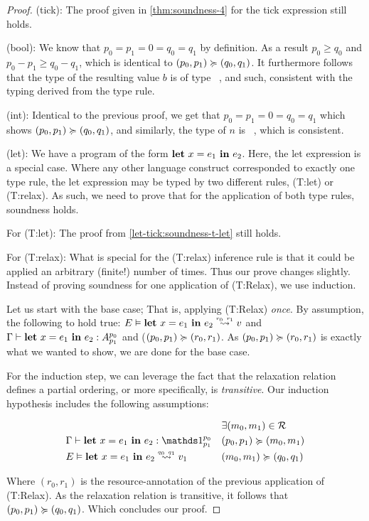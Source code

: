 \begin{proof}

(tick): The proof given in \cref{thm:soundness-4} for the tick expression still holds.

(bool): We know that \(p_0 = p_1 = 0 = q_0 = q_1\) by definition. As a result \(p_0 \geq q_0\) and \(p_0 - p_1 \geq q_0 - q_1\), which is identical to \((p_0, p_1) \succcurlyeq (q_0, q_1)\). It furthermore follows that the type of the resulting value \(b\) is of type \bool~, and such, consistent with the typing derived from the type rule.

(int): Identical to the previous proof, we get that \(p_0 = p_1 = 0 = q_0 = q_1\) which shows \((p_0, p_1) \succcurlyeq (q_0, q_1)\), and similarly, the type of \(n\) is \typeint~, which is consistent.

(let): We have a program of the form \(\mathbf{let}~x = e_1~\mathbf{in}~e_2\). Here, the let expression is a special case. Where any other language construct corresponded to exactly one type rule, the let expression may be typed by two different rules, (T:let) or (T:relax). As such, we need to prove that for the application of both type rules, soundness holds.  

For (T:let): The proof from \cref{let-tick:soundness-t-let} still holds.

For (T:relax): What is special for the (T:relax) inference rule is that it could be applied an arbitrary (finite!) number of times. Thus our prove changes slightly. Instead of proving soundness for one application of (T:Relax), we use induction. 

Let us start with the base case; That is, applying (T:Relax) \emph{once}. By assumption, the following to hold true: \(\evals{E}{\letexp{x}{e_1}{e_2}}{v}{r_0}{r_1}\) and \(\Gamma \vdash \mathbf{let}~x = e_1~\mathbf{in}~e_2 : A ^{p_0}_{p_1}\) and (\((p_0, p_1) \succcurlyeq (r_0, r_1)\). As \((p_0, p_1) \succcurlyeq (r_0, r_1)\) is exactly what we wanted to show, we are done for the base case.

For the induction step, we can leverage the fact that the relaxation relation defines a partial ordering, or more specifically, is \emph{transitive}. Our induction hypothesis includes the following assumptions:

   \begin{align*}
      &										    & &\exists (m_0, m_1) \in \resource\\
      &\typing{\Gamma}{\letexp{x}{e_1}{e_2}}{\ratype{\unit}{p_0}{p_1}}                   & &(p_0, p_1)\relaxation (m_0, m_1)\\
      &\evals{E}{\letexp{x}{e_1}{e_2}}{v_1}{q_0}{q_1}                               & &(m_0, m_1)\relaxation (q_0, q_1)\\
   \end{align*}

Where \((r_0, r_1)\) is the resource-annotation of the previous application of (T:Relax). As the relaxation relation is transitive, it follows that \((p_0, p_1) \succcurlyeq (q_0, q_1)\). Which concludes our proof.

\end{proof}





